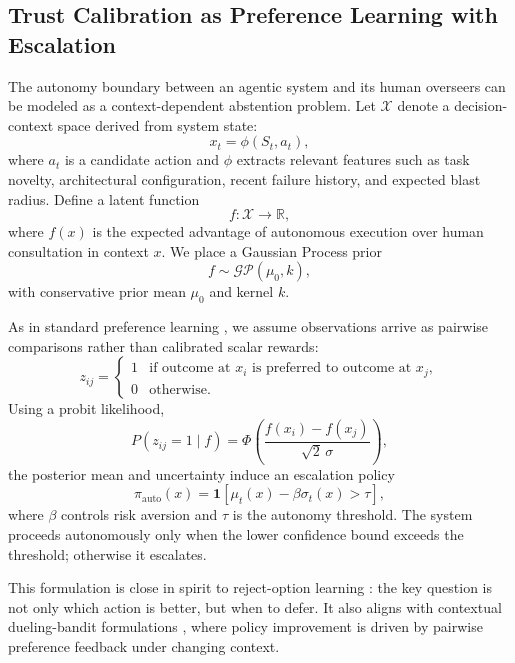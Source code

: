 \subsection{Trust Calibration as Preference Learning with Escalation}

The autonomy boundary between an agentic system and its human overseers can be modeled as a context-dependent abstention problem. Let $\mathcal{X}$ denote a decision-context space derived from system state:
\begin{equation}
x_t = \phi(S_t, a_t),
\end{equation}
where $a_t$ is a candidate action and $\phi$ extracts relevant features such as task novelty, architectural configuration, recent failure history, and expected blast radius. Define a latent function
\begin{equation}
f: \mathcal{X} \to \mathbb{R},
\end{equation}
where $f(x)$ is the expected advantage of autonomous execution over human consultation in context $x$. We place a Gaussian Process prior
\begin{equation}
f \sim \mathcal{GP}(\mu_0, k),
\end{equation}
with conservative prior mean $\mu_0$ and kernel $k$.

As in standard preference learning \cite{chu2005,houlsby2011}, we assume observations arrive as pairwise comparisons rather than calibrated scalar rewards:
\begin{equation}
z_{ij} =
\begin{cases}
1 & \text{if outcome at } x_i \text{ is preferred to outcome at } x_j, \\
0 & \text{otherwise.}
\end{cases}
\end{equation}
Using a probit likelihood,
\begin{equation}
P(z_{ij}=1 \mid f) =
\Phi\!\left(\frac{f(x_i)-f(x_j)}{\sqrt{2}\,\sigma}\right),
\end{equation}
the posterior mean and uncertainty induce an escalation policy
\begin{equation}
\pi_{\mathrm{auto}}(x)=
\mathbf{1}\!\left[\mu_t(x)-\beta \sigma_t(x) > \tau\right],
\end{equation}
where $\beta$ controls risk aversion and $\tau$ is the autonomy threshold. The system proceeds autonomously only when the lower confidence bound exceeds the threshold; otherwise it escalates.

This formulation is close in spirit to reject-option learning \cite{bartlett2008}: the key question is not only which action is better, but when to defer. It also aligns with contextual dueling-bandit formulations \cite{dudik2015}, where policy improvement is driven by pairwise preference feedback under changing context.

